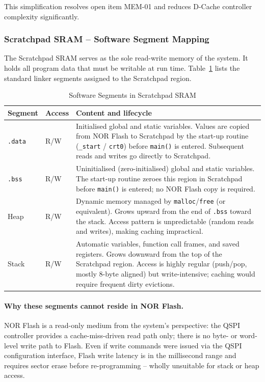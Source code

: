 This simplification resolves open item MEM-01 and reduces D-Cache
controller complexity significantly.

\subsubsection{Scratchpad SRAM -- Software Segment Mapping}
\label{subsubsec:scratchpadSegments}

The Scratchpad SRAM serves as the sole read-write memory of the system.
It holds all program data that must be writable at run time.
Table~\ref{tab:asScratchpadSegments} lists the standard linker segments
assigned to the Scratchpad region.

\begin{table}[H]
\caption{Software Segments in Scratchpad SRAM}
\label{tab:asScratchpadSegments}
\centering
\begin{tabularx}{\textwidth}{|l |l |X|}
  \hline
  Segment & Access & Content and lifecycle \\
  \hline
  \hline
  \texttt{.data} & R/W & Initialised global and static variables.
    Values are copied from NOR Flash to Scratchpad by the start-up
    routine (\texttt{\_start} / \texttt{crt0}) before \texttt{main()}
    is entered.
    Subsequent reads and writes go directly to Scratchpad. \\
  \hline
  \texttt{.bss}  & R/W & Uninitialised (zero-initialised) global and
    static variables.
    The start-up routine zeroes this region in Scratchpad before
    \texttt{main()} is entered; no NOR Flash copy is required. \\
  \hline
  Heap           & R/W & Dynamic memory managed by \texttt{malloc}/\texttt{free}
    (or equivalent).
    Grows upward from the end of \texttt{.bss} toward the stack.
    Access pattern is unpredictable (random reads and writes), making
    caching impractical. \\
  \hline
  Stack          & R/W & Automatic variables, function call frames,
    and saved registers.
    Grows downward from the top of the Scratchpad region.
    Access is highly regular (push/pop, mostly 8-byte aligned) but
    write-intensive; caching would require frequent dirty evictions. \\
  \hline
\end{tabularx}
\end{table}

\paragraph{Why these segments cannot reside in NOR Flash.}
NOR Flash is a read-only medium from the system's perspective: the QSPI
controller provides a cache-miss-driven read path only; there is no byte-
or word-level write path to Flash.
Even if write commands were issued via the QSPI configuration interface,
Flash write latency is in the millisecond range and requires sector erase
before re-programming -- wholly unsuitable for stack or heap access.

